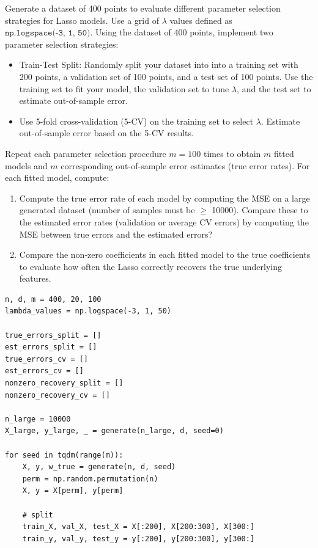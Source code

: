 \documentclass{article}
\begin{document}
\begin{probset}
\begin{prob}
\begin{subprobset}
\begin{subprob}
            Generate a dataset of 400 points to evaluate different parameter selection strategies for Lasso models. Use a grid of $\lambda$ values defined as $\texttt{np.logspace(-3, 1, 50)}$. Using the dataset of 400 points, implement two parameter selection strategies:
            \begin{itemize}
                \item Train-Test Split: Randomly split your dataset into into a training set with 200 points, a validation set of 100 points, and a test set of 100 points. Use the training set to fit your model, the validation set to tune $\lambda$, and the test set to estimate out-of-sample error.
                \item Use 5-fold cross-validation (5-CV) on the training set to select $\lambda$. Estimate out-of-sample error based on the 5-CV results.
            \end{itemize}
            Repeat each parameter selection procedure $m = 100$ times to obtain $m$ fitted models and $m$ corresponding out-of-sample error estimates (true error rates). For each fitted model, compute:
            \begin{enumerate}[label=\roman*.]
                \item Compute the true error rate of each model by computing the MSE on a large generated dataset (number of samples must be $\geq$ 10000). Compare these to the estimated error rates (validation or average CV errors) by computing the MSE between true errors and the estimated errors?
                \item Compare the non-zero coefficients in each fitted model to the true coefficients to evaluate how often the Lasso correctly recovers the true underlying features.
            \end{enumerate}

            \begin{verbatim}
n, d, m = 400, 20, 100
lambda_values = np.logspace(-3, 1, 50)

true_errors_split = []
est_errors_split = []
true_errors_cv = []
est_errors_cv = []
nonzero_recovery_split = []
nonzero_recovery_cv = []

n_large = 10000
X_large, y_large, _ = generate(n_large, d, seed=0)

for seed in tqdm(range(m)):
    X, y, w_true = generate(n, d, seed)
    perm = np.random.permutation(n)
    X, y = X[perm], y[perm]
    
    # split
    train_X, val_X, test_X = X[:200], X[200:300], X[300:]
    train_y, val_y, test_y = y[:200], y[200:300], y[300:]
    

\end{verbatim}
\end{subprob}
\end{subprobset}
\end{prob}
\end{probset}
\end{document}
